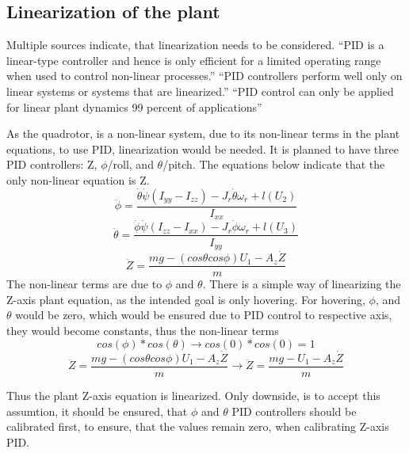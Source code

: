 \subsection{Linearization of the plant}

Multiple sources indicate, that linearization needs to be considered. “PID is a linear-type controller and hence is only efficient for a limited operating range when used to control non-linear processes.” \cite{PIDLinear1} “PID controllers perform well only on linear systems or systems that are linearized.” \cite{PIDLinear2} “PID control can only be applied for linear plant dynamics 99 percent of applications” \cite{PIDLinear3} 

As the quadrotor, is a non-linear system, due to its non-linear terms in the plant equations, to use PID, linearization would be needed. It is planned to have three PID controllers: Z, $\phi$/roll, and $\theta$/pitch. The equations below indicate that the only non-linear equation is Z.
\begin{displaymath}
    \ddot{\phi} = \frac{\dot{\theta}\dot{\psi}(I_{yy}-I_{zz})-J_r\dot{\theta}\omega_r+l(U_2)}{I_{xx}}
\end{displaymath}
\begin{displaymath}
    \ddot{\theta} = \frac{\dot{\phi}\dot{\psi}(I_{zz}-I_{xx})-J_r\dot{\phi}\omega_r+l(U_3)}{I_{yy}}
\end{displaymath}
\begin{displaymath}
    \ddot{Z} = \frac{mg - (cos\theta cos \phi )U_1 - A_z\dot{Z} }{m}
\end{displaymath}
The non-linear terms are due to $\phi$ and $\theta$. There is a simple way of linearizing the Z-axis plant equation, as the intended goal is only hovering. 
For hovering, $\phi$, and $\theta$ would be zero, which would be ensured due to PID control to respective axis, they would become constants, thus the non-linear terms 
\begin{displaymath}
    cos(\phi)*cos(\theta) \longrightarrow cos(0)*cos(0) = 1
\end{displaymath}
\begin{displaymath}
    \ddot{Z} = \frac{mg - (cos\theta cos \phi )U_1 - A_z\dot{Z} }{m} \longrightarrow \ddot{Z} = \frac{mg - U_1 - A_z\dot{Z} }{m}
\end{displaymath}

Thus the plant Z-axis equation is linearized. Only downside, is to accept this assumtion, it should be ensured, that $\phi$ and $\theta$ PID controllers should be calibrated first, to ensure, that the values remain zero, when calibrating Z-axis PID.